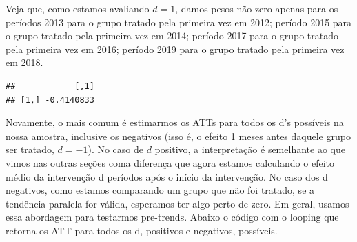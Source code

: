 \documentclass[portugues]{article}
\newenvironment{Shaded}{\begin{snugshade}}{\end{snugshade}}
\newcommand{\AttributeTok}[1]{\textcolor[rgb]{0.13,0.29,0.53}{#1}}
\newcommand{\CommentTok}[1]{\textcolor[rgb]{0.56,0.35,0.01}{\textit{#1}}}
\newcommand{\ConstantTok}[1]{\textcolor[rgb]{0.56,0.35,0.01}{#1}}
\newcommand{\ControlFlowTok}[1]{\textcolor[rgb]{0.13,0.29,0.53}{\textbf{#1}}}
\newcommand{\FunctionTok}[1]{\textcolor[rgb]{0.13,0.29,0.53}{\textbf{#1}}}
\newcommand{\NormalTok}[1]{#1}
\newcommand{\OtherTok}[1]{\textcolor[rgb]{0.56,0.35,0.01}{#1}}
\newcommand{\SpecialCharTok}[1]{\textcolor[rgb]{0.81,0.36,0.00}{\textbf{#1}}}
\newcommand{\StringTok}[1]{\textcolor[rgb]{0.31,0.60,0.02}{#1}}
\begin{document}
\begin{box_code}
Veja que, como estamos avaliando $d=1$, damos pesos não zero apenas para os períodos 2013 para o grupo tratado pela primeira vez em 2012; período 2015 para o grupo tratado pela primeira vez em 2014; período 2017 para o grupo tratado pela primeira vez em 2016; período 2019 para o grupo tratado pela primeira vez em 2018.

\begin{Shaded}
\end{Shaded}

\begin{verbatim}
##            [,1]
## [1,] -0.4140833
\end{verbatim}

Novamente, o mais comum é estimarmos os ATTs para todos os d's possíveis na nossa amostra, inclusive os negativos (isso é, o efeito 1 meses antes daquele grupo ser tratado, $d = -1$). No caso de $d$ positivo, a interpretação é semelhante ao que vimos nas outras seções coma  diferença que agora estamos calculando o efeito médio da intervenção d períodos após o início da intervenção. No caso dos d negativos, como estamos comparando um grupo que não foi tratado, se a tendência paralela for válida, esperamos ter algo perto de zero. Em geral, usamos essa abordagem para testarmos pre-trends. Abaixo o código com o looping que retorna os ATT para todos os d, positivos e negativos, possíveis. 

\begin{Shaded}
\end{Shaded}


\end{box_code}
\end{document}
